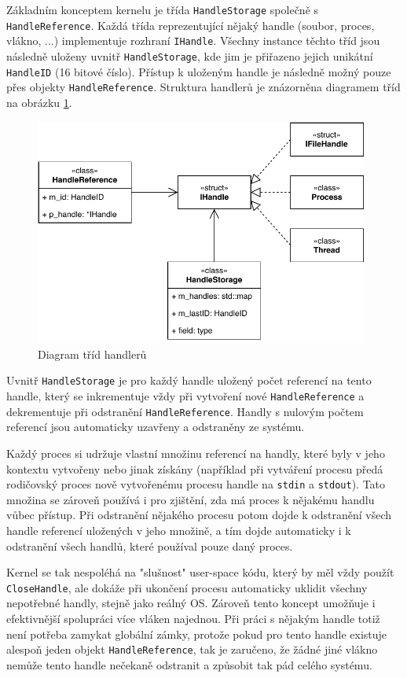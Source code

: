 \documentclass[11pt,a4paper]{scrartcl}
\begin{document}
	Základním konceptem kernelu je třída \verb|HandleStorage| společně s \verb|HandleReference|. Každá třída reprezentující nějaký handle (soubor, proces, vlákno, ...) implementuje rozhraní \verb|IHandle|. Všechny instance těchto tříd jsou následně uloženy uvnitř \verb|HandleStorage|, kde jim je přiřazeno jejich unikátní \verb|HandleID| (16 bitové číslo). Přístup k uloženým handle je následně možný pouze přes objekty \verb|HandleReference|. Struktura handlerů je znázorněna diagramem tříd na obrázku \ref{fig:handle-class-d}.
	
	\begin{figure}[H]
		\centering
		\includegraphics[width=11cm]{handle-class-d.pdf}
		\caption{Diagram tříd handlerů}
		\label{fig:handle-class-d}
	\end{figure}
	
	Uvnitř \verb|HandleStorage| je pro každý handle uložený počet referencí na tento handle, který se inkrementuje vždy při vytvoření nové \verb|HandleReference| a dekrementuje při odstranění \verb|HandleReference|. Handly s nulovým počtem referencí jsou automaticky uzavřeny a odstraněny ze systému. 
	
	Každý proces si udržuje vlastní množinu referencí na handly, které byly v jeho kontextu vytvořeny nebo jinak získány (například při vytváření procesu předá rodičovský proces nově vytvořenému procesu handle na \verb|stdin| a \verb|stdout|). Tato množina se zároveň používá i pro zjištění, zda má proces k nějakému handlu vůbec přístup. Při odstranění nějakého procesu potom dojde k odstranění všech handle referencí uložených v jeho množině, a tím dojde automaticky i k odstranění všech handlů, které používal pouze daný proces. 
	
	Kernel se tak nespoléhá na "slušnost" user-space kódu, který by měl vždy použít \verb|CloseHandle|, ale dokáže při ukončení procesu automaticky uklidit všechny nepotřebné handly, stejně jako reálný OS. Zároveň tento koncept umožňuje i efektivnější spolupráci více vláken najednou. Při práci s nějakým handle totiž není potřeba zamykat globální zámky, protože pokud pro tento handle existuje alespoň jeden objekt \verb|HandleReference|, tak je zaručeno, že žádné jiné vlákno nemůže tento handle nečekaně odstranit a způsobit tak pád celého systému.
	
\end{document}
